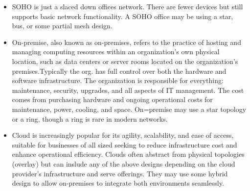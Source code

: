 \documentclass{article}
\begin{document}
\begin{itemize}
  	\item[] SOHO is just a slaced down offices network. There are fewer devices but still supports basic network functionality. A SOHO office may be using a star, bus, or some partial mesh design. 
  	
  	\item[] On-premise, also known as on-premises, refers to the practice of hosting and managing computing resources within an organization's own physical location, such as data centers or server rooms located on the organization's premises.Typically the org. has full control over both the hardware and software infrastructure. The organization is responsible for everything: maintenance, security, upgrades, and all aspects of IT management. The cost comes from purchasing hardware and ongoing operational costs for maintenance, power, cooling, and space. On=premise may use a star topology or a ring, though a ring is rare in modern networks.
  	
  	\item[] Cloud is increasingly popular for its agility, scalability, and ease of access, suitable for businesses of all sized seeking to reduce infrastructure cost and enhance operational efficiency. Clouds often abstract from physical topologies (overlay) but can inslude any of the above designs depending on the cloud provider's infrastructure and serve offerings. They may use some hybrid design to allow on-premises to integrate both environments seamlessly.
  

\end{itemize}
\end{document}
